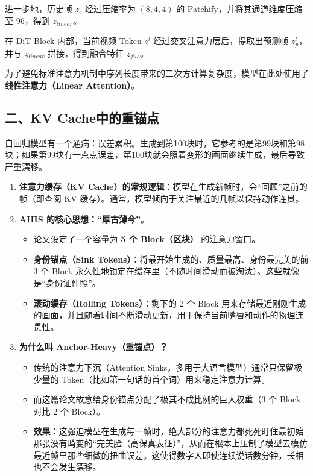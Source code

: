 进一步地，历史帧 \(z_c\) 经过压缩率为 \((8,4,4)\) 的 Patchify，并将其通道维度压缩至 96，得到 \(z_{linear}\)。

在 DiT Block 内部，当前视频 Token \(z^l\) 经过交叉注意力层后，提取出预测帧 \(z_p^l\)，并与 \(z_{linear}\) 拼接，得到融合特征 \(z_{fus}\)。

为了避免标准注意力机制中序列长度带来的二次方计算复杂度，模型在此处使用了\textbf{线性注意力（Linear Attention）}。

\hypertarget{ux4e8ckv-cacheux4e2dux7684ux91cdux951aux70b9}{%
\subsection{二、KV Cache中的重锚点}\label{ux4e8ckv-cacheux4e2dux7684ux91cdux951aux70b9}}

自回归模型有一个通病：误差累积。生成到第100块时，它参考的是第99块和第98块；如果第99块有一点点误差，第100块就会照着变形的画面继续生成，最后导致严重漂移。

\begin{enumerate}
\def\labelenumi{\arabic{enumi}.}
\item
  \textbf{注意力缓存（KV Cache）的常规逻辑}：模型在生成新帧时，会``回顾''之前的帧（即查阅 KV 缓存）。通常，模型倾向于关注最近的几帧以保持动作连贯。
\item
  \textbf{AHIS 的核心思想：``厚古薄今''}。

  \begin{itemize}
  \tightlist
  \item
    论文设定了一个容量为 \textbf{5 个 Block（区块）} 的注意力窗口。
  \item
    \textbf{身份锚点（Sink Tokens）}：将最开始生成的、质量最高、身份最完美的前 3 个 Block 永久性地锁定在缓存里（不随时间滑动而被淘汰）。这些就像是``身份证件照''。
  \item
    \textbf{滚动缓存（Rolling Tokens）}：剩下的 2 个 Block 用来存储最近刚刚生成的画面，并且随着时间不断滑动更新，用于保持当前嘴唇和动作的物理连贯性。
  \end{itemize}
\item
  \textbf{为什么叫 Anchor-Heavy（重锚点）？}

  \begin{itemize}
  \tightlist
  \item
    传统的注意力下沉（Attention Sinks，多用于大语言模型）通常只保留极少量的 Token（比如第一句话的首个词）用来稳定注意力计算。
  \item
    而这篇论文故意给身份锚点分配了极其不成比例的巨大权重（3 个 Block 对比 2 个 Block）。
  \item
    \textbf{效果}：这强迫模型在生成每一帧时，绝大部分的注意力都死死盯住最初始那张没有畸变的``完美脸（高保真表征）''，从而在根本上压制了模型去模仿最近帧里那些细微的扭曲误差。这使得数字人即使连续说话数分钟，长相也不会发生漂移。
  \end{itemize}
\end{enumerate}

